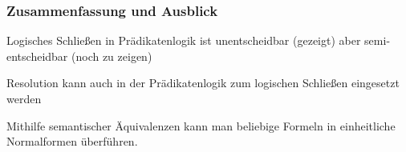 \documentclass[onlymath]{beamer}
\begin{document}
% 
% 
% 
% 

% 
% 






\begin{frame}\frametitle{Zusammenfassung und Ausblick}

Logisches Schließen in Prädikatenlogik ist unentscheidbar
(gezeigt)
aber semi-entscheidbar 
(noch zu zeigen)\bigskip

Resolution kann auch in der Prädikatenlogik zum logischen Schließen eingesetzt werden
\bigskip

Mithilfe semantischer Äquivalenzen kann man beliebige Formeln in einheitliche Normalformen überführen.\bigskip


\end{frame}
\end{document}
